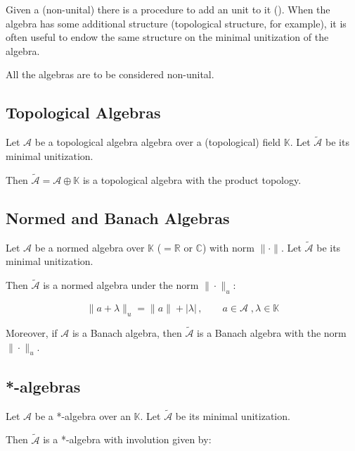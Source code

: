 \documentclass[12pt]{article}
\begin{document}

Given a (non-unital)  there is a  procedure to add an unit to it (). When the algebra has some additional structure (topological structure, for example), it is often useful to endow the same structure on the minimal unitization of the algebra.

All the algebras are to be considered non-unital.


\subsection{Topological Algebras}

Let $\mathcal{A}$ be a topological algebra algebra over a (topological) field $\mathbb{K}$. Let $\widetilde{\mathcal{A}}$ be its minimal unitization.

Then $\widetilde{\mathcal{A}} = \mathcal{A} \oplus \mathbb{K}$ is a topological algebra with the product topology.


\subsection{Normed and Banach Algebras}
Let $\mathcal{A}$ be a normed algebra over $\mathbb{K}$ ($= \mathbb{R}$ or $\mathbb{C}$) with norm $\| \cdot \|$. Let $\widetilde{\mathcal{A}}$ be its minimal unitization.

Then $\widetilde{\mathcal{A}}$ is a normed algebra under the norm $\| \cdot \|_u$:

\begin{displaymath}
\|a+\lambda\|_u = \|a\| +|\lambda|\,, \qquad a \in \mathcal{A} \;, \lambda \in \mathbb{K}
\end{displaymath}

Moreover, if $\mathcal{A}$ is a Banach algebra, then $\widetilde{\mathcal{A}}$ is a Banach algebra with the norm $\|\cdot\|_u$.

\subsection{*-algebras}

Let $\mathcal{A}$ be a *-algebra over an  $\mathbb{K}$. Let $\widetilde{\mathcal{A}}$ be its minimal unitization.

Then $\widetilde{\mathcal{A}}$ is a *-algebra with involution given by:
\end{document}
